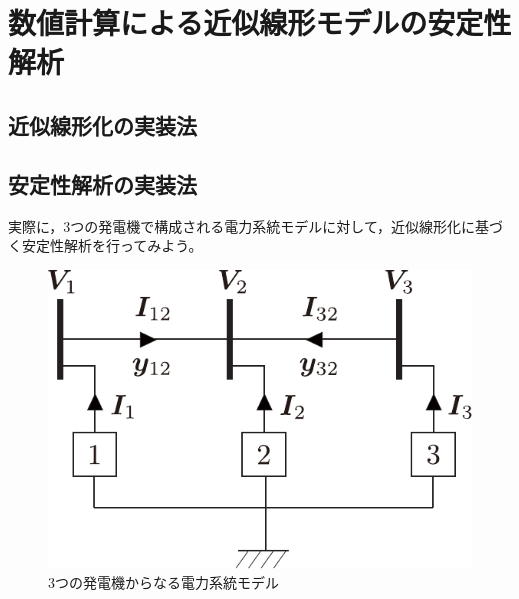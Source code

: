\documentclass[tombow,dvipdfmx]{corona-a5}
\begin{document}
\section{数値計算による近似線形モデルの安定性解析}\label{sec:numlinsta}



\subsection{近似線形化の実装法}

\subsection{安定性解析の実装法}

実際に，3つの発電機で構成される電力系統モデルに対して，近似線形化に基づく安定性解析を行ってみよう。

\begin{figure}[t]
\centering
\includegraphics[width = .30\linewidth]{figs/3busex}
\caption{3つの発電機からなる電力系統モデル}
\label{fig:3genex}
\end{figure}
\end{document}

